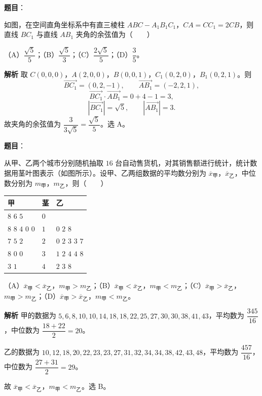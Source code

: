 \begin{answer}

\textbf{题目}：

如图，在空间直角坐标系中有直三棱柱 $ABC-A_1B_1C_1$，$CA=CC_1=2CB$，则直线 $BC_1$ 与直线 $AB_1$ 夹角的余弦值为\mbox{（　　）}
\nopagebreak[4]
\begin{center}\end{center}
\nopagebreak[4]
（A）$\dfrac{\sqrt5}5$；（B）$\dfrac{\sqrt5}3$；（C）$\dfrac{2\sqrt5}5$；（D）$\dfrac35$。

\textbf{解析}
取 $C(0,0,0)$，$A(2,0,0)$，$B(0,0,1)$，$C_1(0,2,0)$，$B_1(0,2,1)$。则
\nopagebreak[4]
\[\overrightarrow{BC_1}=(0,2,-1),\qquad \overrightarrow{AB_1}=(-2,2,1),\]
\nopagebreak[4]
\[\overrightarrow{BC_1}\cdot\overrightarrow{AB_1}=0+4-1=3,\]
\nopagebreak[4]
\[|\overrightarrow{BC_1}|=\sqrt5,\qquad |\overrightarrow{AB_1}|=3.\]
故夹角的余弦值为 $\dfrac3{3\sqrt5}=\dfrac{\sqrt5}5$。选 A。


\end{answer}
\begin{answer}

\textbf{题目}：

从甲、乙两个城市分别随机抽取 $16$ 台自动售货机，对其销售额进行统计，统计数据用茎叶图表示（如图所示）。设甲、乙两组数据的平均数分别为 $\overline x_\text{甲}$，$\overline x_\text{乙}$，中位数分别为 $m_\text{甲}$，$m_\text{乙}$，则\mbox{（　　）}

\begin{center}
\begin{tabular}{lll}
\toprule
甲 & 茎 & 乙 \\
\midrule
$8$ $6$ $5$ & $0$ &  \\
$8$ $8$ $4$ $0$ $0$ & $1$ & $0$ $2$ $8$ \\
$7$ $5$ $2$ & $2$ & $0$ $2$ $3$ $3$ $7$ \\
$8$ $0$ $0$ & $3$ & $1$ $2$ $4$ $4$ $8$ \\
$3$ $1$ & $4$ & $2$ $3$ $8$ \\
\bottomrule
\end{tabular}
\end{center}

（A）$\overline x_\text{甲}<\overline x_\text{乙}$，$m_\text{甲}>m_\text{乙}$；（B）$\overline x_\text{甲}<\overline x_\text{乙}$，$m_\text{甲}<m_\text{乙}$；（C）$\overline x_\text{甲}>\overline x_\text{乙}$，$m_\text{甲}>m_\text{乙}$；（D）$\overline x_\text{甲}>\overline x_\text{乙}$，$m_\text{甲}<m_\text{乙}$。

\textbf{解析}
甲的数据为 $5,6,8,10,10,14,18,18,22,25,27,30,30,38,41,43$，平均数为 $\dfrac{345}{16}$，中位数为 $\dfrac{18+22}2=20$。

乙的数据为 $10,12,18,20,22,23,23,27,31,32,34,34,38,42,43,48$，平均数为 $\dfrac{457}{16}$，中位数为 $\dfrac{27+31}2=29$。

故 $\overline x_\text{甲}<\overline x_\text{乙}$，$m_\text{甲}<m_\text{乙}$。选 B。


\end{answer}
